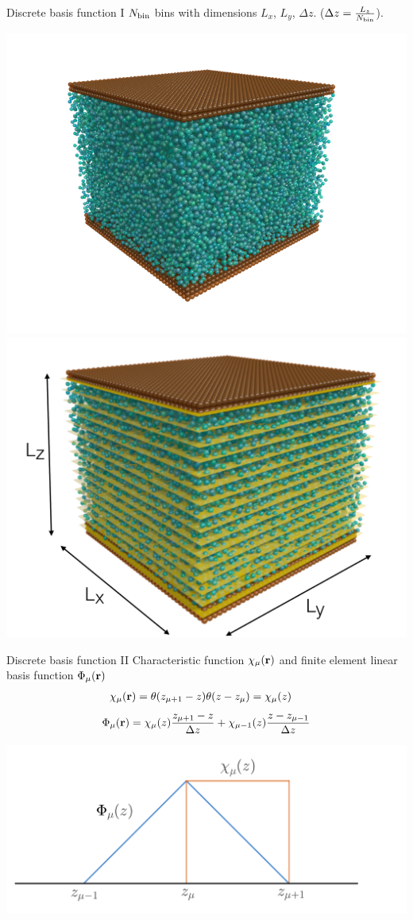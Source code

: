\documentclass{beamer}
\begin{document}
\begin{frame}{Discrete basis function I}
  $N_{\rm bin}$ bins with dimensions $L_x$, $L_y$, $\Delta z$. ($\Delta z = \frac{L_z}{N_{\rm bin}}$). 
      \begin{center}
        \includegraphics[width=.5\linewidth]{PRL3_gold2_wo_layers_wo_diffuse}
        \includegraphics[width=.45\linewidth]{scheme-bines}
      \end{center}
  \end{frame}
\begin{frame}{Discrete basis function II}
  Characteristic function $\chi_{\mu}({\bf r})$ and finite element linear basis function $\Phi_{\mu}({\bf r})$
    \begin{align}
    \chi_\mu({\bf r})&=\theta(z_{\mu+ 1}-z)\theta(z-z_\mu)=\chi_\mu(z)
    \nonumber
    \end{align}
    \begin{align}
      \Phi_\mu({\bf r})=\chi_\mu(z)\frac{z_{\mu+1}-z}{\Delta z}+\chi_{\mu-1}(z)\frac{z-z_{\mu-1}}{\Delta z}
      \nonumber
    \end{align}
    \begin{center} 
      \includegraphics[width = \linewidth]{psichi}
    \end{center}
\end{frame}
\end{document}
